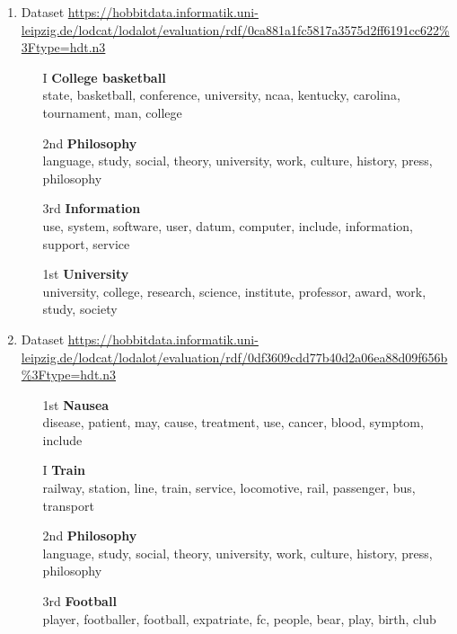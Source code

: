 \begin{enumerate}
\item Dataset \url{https://hobbitdata.informatik.uni-leipzig.de/lodcat/lodalot/evaluation/rdf/0ca881a1fc5817a3575d2ff6191cc622%3Ftype=hdt.n3}
\begin{itemize}
\item[I] \textbf{College basketball}\\
state, basketball, conference, university, ncaa, kentucky, carolina, tournament, man, college
\item[2nd] \textbf{Philosophy}\\
language, study, social, theory, university, work, culture, history, press, philosophy
\item[3rd] \textbf{Information}\\
use, system, software, user, datum, computer, include, information, support, service
\item[1st] \textbf{University}\\
university, college, research, science, institute, professor, award, work, study, society
\end{itemize}
\vspace{1cm}

\item Dataset \url{https://hobbitdata.informatik.uni-leipzig.de/lodcat/lodalot/evaluation/rdf/0df3609cdd77b40d2a06ea88d09f656b%3Ftype=hdt.n3}
\begin{itemize}
\item[1st] \textbf{Nausea}\\
disease, patient, may, cause, treatment, use, cancer, blood, symptom, include
\item[I] \textbf{Train}\\
railway, station, line, train, service, locomotive, rail, passenger, bus, transport
\item[2nd] \textbf{Philosophy}\\
language, study, social, theory, university, work, culture, history, press, philosophy
\item[3rd] \textbf{Football}\\
player, footballer, football, expatriate, fc, people, bear,
play, birth, club
\end{itemize}
\vspace{1cm}


\end{enumerate}
